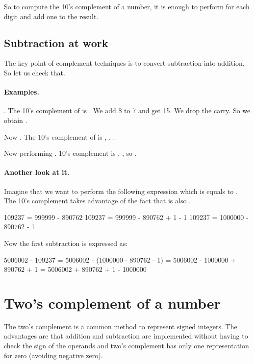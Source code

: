\documentclass[a4paper,10pt,twoside]{book}
\begin{document}
So to compute the 10's complement of a number, it is enough to perform  for each digit and add one to the result.


\subsection{Subtraction at work}
The key point of complement techniques is to convert subtraction into addition. So let us check that.

\paragraph{Examples.}
. The 10's complement of  is . We add 8 to 7 and get 15. 
We drop the carry. So we obtain .


Now . The 10's complement of  is ,  \ie {} \ie {}. 
.

Now performing .  10's complement is , , so .


\paragraph{Another look at it.} 
Imagine that we want to perform the following expression  which is equals to .
The 10's complement takes advantage of the fact that  is also .

\begin{code}{}
109237 = 999999 - 890762
109237 = 999999 - 890762 + 1 - 1
109237 = 1000000 - 890762 - 1
\end{code}

Now the first subtraction is expressed as:

\begin{code}{}
5006002 - 109237 = 5006002 - (1000000 - 890762 - 1)
= 5006002 - 1000000 + 890762 + 1
= 5006002  + 890762 + 1 - 1000000
\end{code}


\section{Two's complement of a number}

The two's complement is a common method to represent signed integers. The advantages are that addition and subtraction are implemented without having to  check the sign of the operands and two's complement has only one representation for zero (avoiding negative zero). 
\end{document}
